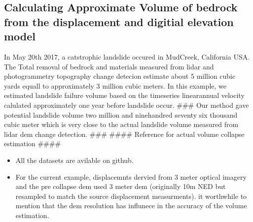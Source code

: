 \documentclass[letterpaper,10pt,english]{sphinxmanual}
\begin{document}
\subsection{Calculating Approximate Volume of bedrock from the displacement and digitial elevation model}
\label{\detokenize{notebooks/MudCreek_Landslide_optical:Calculating-Approximate-Volume-of-bedrock-from-the-displacement-and-digitial-elevation-model}}
\sphinxAtStartPar
In May 20th 2017, a catstrophic landslide occured in MudCreek, California USA. The Total removal of bedrock and materials measured from lidar and photogrammetry topography change detecion estimate about 5 million cubic yards equall to approximately 3 million cubic meters. In this example, we estimated landslide failure volume based on the time\sphinxhyphen{}series linear\sphinxhyphen{}annual velocity calulated approximately one year before landslide occur. \#\#\# Our method gave potential landslide volume two million and
nine\sphinxhyphen{}handred seventy six thousand cubic meter which is very close to the actual landslide volume measured from lidar dem change detection. \#\#\# \#\#\#\# Reference for actual volume collapse estimation \#\#\#\#
\begin{itemize}
\item {} 
\sphinxAtStartPar
All the datasets are avilable on github.

\item {} 
\sphinxAtStartPar
For the current example, displacemnts dervied from 3 meter optical imagery and the pre collapse dem used 3 meter dem (originally 10m NED but resampled to match the source displacement measurments). it worthwhile to mention that the dem resolution has influnece in the accuracy of the volume estimation.

\end{itemize}
\end{document}
